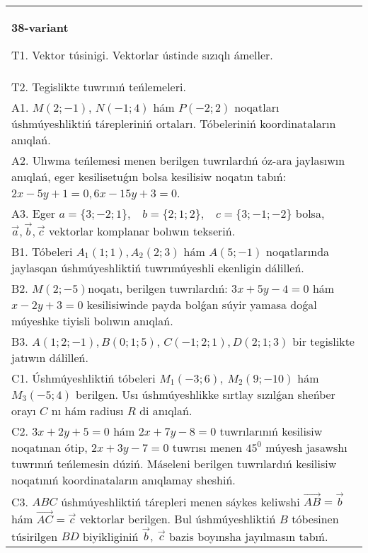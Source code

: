 \documentclass{article}
\begin{document}
\begin{tabular}{m{17cm}}
\textbf{38-variant}
\newline

T1. 
Vektor túsinigi. Vektorlar ústinde sızıqlı ámeller.
 \\
T2. 
Tegislikte tuwrınıń teńlemeleri.
 \\
A1. 
$M(2;-1)$, $N(-1;4)$ hám $P(-2;2)$ noqatları
úshmúyeshliktiń tárepleriniń ortaları. Tóbeleriniń koordinataların
anıqlań.
 \\
A2. 
Ulıwma teńlemesi menen berilgen tuwrılardıń
óz-ara jaylasıwın anıqlań, eger kesilisetuǵın bolsa kesilisiw noqatın
tabıń: $2x-5y+1=0, 6x-15y+3=0$.
 \\
A3. 
Eger \(a = \{ 3; - 2;1\},\ \ \ \ b = \{ 2;1;2\},\ \ \ \ c = \{ 3; - 1; - 2\}\) bolsa, $\overrightarrow{a}, \overrightarrow{b}, \overrightarrow{c}$ vektorlar komplanar bolıwın tekseriń.
 \\
B1. 
Tóbeleri $A_1(1; 1), A_2(2; 3)$ hám $A(5;-1)$
noqatlarında jaylasqan úshmúyeshliktiń tuwrımúyeshli ekenligin dálilleń.
 \\
B2. 
\(M(2;-5)\)noqatı, berilgen tuwrılardıń:
\(3x+5y-4=0\) hám \(x-2y+3=0\) kesilisiwinde payda
bolǵan súyir yamasa doǵal múyeshke tiyisli bolıwın anıqlań.
 \\
B3. 
$A (1;2; - 1),B (0;1;5) $, $C (- 1;2;1),D (2;1;3) $ bir tegislikte jatıwın dálilleń.
 \\
C1. 
Úshmúyeshliktiń tóbeleri \(M_{1}( - 3;6),\ M_{2}(9; - 10)\) 
hám \(M_{3}( - 5;4)\) berilgen. Usı úshmúyeshlikke sırtlay sızılǵan
sheńber orayı $C$ nı hám radiusı $R$ di anıqlań.
 \\
C2. 
\(3x + 2y + 5 = 0\) hám \(2x + 7y - 8 = 0\) tuwrılarınıń
kesilisiw noqatınan ótip, \(2x + 3y - 7 = 0\) tuwrısı menen
$45^0$ múyesh jasawshı tuwrınıń teńlemesin dúziń.
Máseleni berilgen tuwrılardıń kesilisiw noqatınıń koordinataların anıqlamay
sheshiń.
 \\
C3. 
\(ABC\) úshmúyeshliktiń tárepleri menen sáykes keliwshi \(\vec{AB} = \vec{b}\) hám \(\vec{AC} = \vec{c}\) vektorlar berilgen. Bul úshmúyeshliktiń \(B\) tóbesinen túsirilgen \(BD\) biyikliginiń \(\vec{b},\ \vec{c}\) bazis boyınsha jayılmasın tabıń.
 \\

\end{tabular}
\vspace{1cm}
\end{document}
